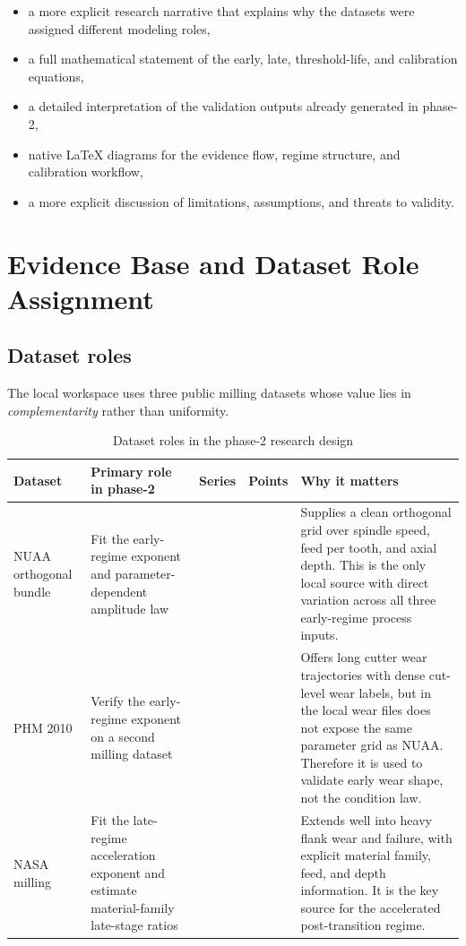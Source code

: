 \documentclass[11pt,a4paper]{article}
\begin{document}
\begin{itemize}[leftmargin=1.6em]
\item a more explicit research narrative that explains why the datasets were assigned different modeling roles,
\item a full mathematical statement of the early, late, threshold-life, and calibration equations,
\item a detailed interpretation of the validation outputs already generated in phase-2,
\item native LaTeX diagrams for the evidence flow, regime structure, and calibration workflow,
\item a more explicit discussion of limitations, assumptions, and threats to validity.
\end{itemize}

\section{Evidence Base and Dataset Role Assignment}

\subsection{Dataset roles}

The local workspace uses three public milling datasets whose value lies in \emph{complementarity} rather than
uniformity.

\begin{table}[H]
\centering
\caption{Dataset roles in the phase-2 research design}
\begin{tabularx}{\textwidth}{>{\raggedright\arraybackslash}p{1.9cm}>{\raggedright\arraybackslash}p{3.1cm}>{\raggedright\arraybackslash}p{1.3cm}>{\raggedright\arraybackslash}p{1.5cm}>{\raggedright\arraybackslash}X}
\toprule
Dataset & Primary role in phase-2 & Series & Points & Why it matters \\
\midrule
NUAA orthogonal bundle & Fit the early-regime exponent and parameter-dependent amplitude law & 9 & 152 & Supplies a clean orthogonal grid over spindle speed, feed per tooth, and axial depth. This is the only local source with direct variation across all three early-regime process inputs. \\
PHM 2010 & Verify the early-regime exponent on a second milling dataset & 3 & 945 & Offers long cutter wear trajectories with dense cut-level wear labels, but in the local wear files does not expose the same parameter grid as NUAA. Therefore it is used to validate early wear shape, not the condition law. \\
NASA milling & Fit the late-regime acceleration exponent and estimate material-family late-stage ratios & 16 & 146 & Extends well into heavy flank wear and failure, with explicit material family, feed, and depth information. It is the key source for the accelerated post-transition regime. \\
\bottomrule
\end{tabularx}
\end{table}
\end{document}
